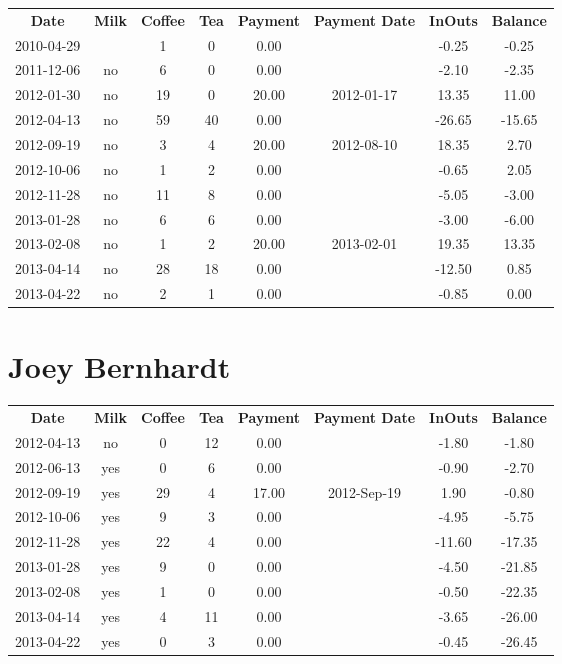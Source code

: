 \begin{center}
\begin{tabular}{cccccccc}
\textbf{Date} & \textbf{Milk} & \textbf{Coffee} & \textbf{Tea} & \textbf{Payment} & \textbf{Payment Date} & \textbf{InOuts} & \textbf{Balance} \\
2010-04-29 &  &  1 &  0 &  0.00 &  &  -0.25 &  -0.25\\ 
2011-12-06 & no &  6 &  0 &  0.00 &  &  -2.10 &  -2.35\\ 
2012-01-30 & no & 19 &  0 & 20.00 & 2012-01-17 &  13.35 &  11.00\\ 
2012-04-13 & no & 59 & 40 &  0.00 &  & -26.65 & -15.65\\ 
2012-09-19 & no &  3 &  4 & 20.00 & 2012-08-10 &  18.35 &   2.70\\ 
2012-10-06 & no &  1 &  2 &  0.00 &  &  -0.65 &   2.05\\ 
2012-11-28 & no & 11 &  8 &  0.00 &  &  -5.05 &  -3.00\\ 
2013-01-28 & no &  6 &  6 &  0.00 &  &  -3.00 &  -6.00\\ 
2013-02-08 & no &  1 &  2 & 20.00 & 2013-02-01 &  19.35 &  13.35\\ 
2013-04-14 & no & 28 & 18 &  0.00 &  & -12.50 &   0.85\\ 
2013-04-22 & no &  2 &  1 &  0.00 &  &  -0.85 &   0.00
\end{tabular}
\end{center}

\section{Joey Bernhardt}

\begin{center}
\begin{tabular}{cccccccc}
\textbf{Date} & \textbf{Milk} & \textbf{Coffee} & \textbf{Tea} & \textbf{Payment} & \textbf{Payment Date} & \textbf{InOuts} & \textbf{Balance} \\
2012-04-13 & no &  0 & 12 &  0.00 &  &  -1.80 &  -1.80\\ 
2012-06-13 & yes &  0 &  6 &  0.00 &  &  -0.90 &  -2.70\\ 
2012-09-19 & yes & 29 &  4 & 17.00 & 2012-Sep-19 &   1.90 &  -0.80\\ 
2012-10-06 & yes &  9 &  3 &  0.00 &  &  -4.95 &  -5.75\\ 
2012-11-28 & yes & 22 &  4 &  0.00 &  & -11.60 & -17.35\\ 
2013-01-28 & yes &  9 &  0 &  0.00 &  &  -4.50 & -21.85\\ 
2013-02-08 & yes &  1 &  0 &  0.00 &  &  -0.50 & -22.35\\ 
2013-04-14 & yes &  4 & 11 &  0.00 &  &  -3.65 & -26.00\\ 
2013-04-22 & yes &  0 &  3 &  0.00 &  &  -0.45 & -26.45
\end{tabular}
\end{center}

